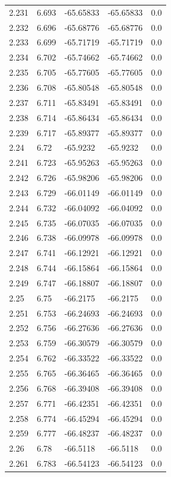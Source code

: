 \begin{tabular}{lllll}
2.231 & 6.693 & -65.65833 & -65.65833 & 0.0 \\
2.232 & 6.696 & -65.68776 & -65.68776 & 0.0 \\
2.233 & 6.699 & -65.71719 & -65.71719 & 0.0 \\
2.234 & 6.702 & -65.74662 & -65.74662 & 0.0 \\
2.235 & 6.705 & -65.77605 & -65.77605 & 0.0 \\
2.236 & 6.708 & -65.80548 & -65.80548 & 0.0 \\
2.237 & 6.711 & -65.83491 & -65.83491 & 0.0 \\
2.238 & 6.714 & -65.86434 & -65.86434 & 0.0 \\
2.239 & 6.717 & -65.89377 & -65.89377 & 0.0 \\
2.24 & 6.72 & -65.9232 & -65.9232 & 0.0 \\
2.241 & 6.723 & -65.95263 & -65.95263 & 0.0 \\
2.242 & 6.726 & -65.98206 & -65.98206 & 0.0 \\
2.243 & 6.729 & -66.01149 & -66.01149 & 0.0 \\
2.244 & 6.732 & -66.04092 & -66.04092 & 0.0 \\
2.245 & 6.735 & -66.07035 & -66.07035 & 0.0 \\
2.246 & 6.738 & -66.09978 & -66.09978 & 0.0 \\
2.247 & 6.741 & -66.12921 & -66.12921 & 0.0 \\
2.248 & 6.744 & -66.15864 & -66.15864 & 0.0 \\
2.249 & 6.747 & -66.18807 & -66.18807 & 0.0 \\
2.25 & 6.75 & -66.2175 & -66.2175 & 0.0 \\
2.251 & 6.753 & -66.24693 & -66.24693 & 0.0 \\
2.252 & 6.756 & -66.27636 & -66.27636 & 0.0 \\
2.253 & 6.759 & -66.30579 & -66.30579 & 0.0 \\
2.254 & 6.762 & -66.33522 & -66.33522 & 0.0 \\
2.255 & 6.765 & -66.36465 & -66.36465 & 0.0 \\
2.256 & 6.768 & -66.39408 & -66.39408 & 0.0 \\
2.257 & 6.771 & -66.42351 & -66.42351 & 0.0 \\
2.258 & 6.774 & -66.45294 & -66.45294 & 0.0 \\
2.259 & 6.777 & -66.48237 & -66.48237 & 0.0 \\
2.26 & 6.78 & -66.5118 & -66.5118 & 0.0 \\
2.261 & 6.783 & -66.54123 & -66.54123 & 0.0 \\

\end{tabular}
